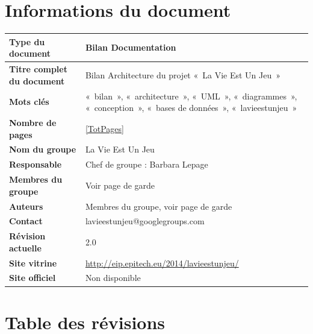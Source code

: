 \documentclass{life-fr}
\begin{document}
\chapter*{Informations du document}

\begin{tabular}{ | m{5cm} | m{10cm} | }
  \hline
  \textbf{Type du document} & Bilan Documentation\\ %
  \hline
  \textbf{Titre complet du document} & Bilan Architecture du projet «~La Vie Est Un Jeu~»\\ %
  \hline
  \textbf{Mots clés} & «~bilan~», «~architecture~», «~UML~», «~diagrammes~», «~conception~», «~bases de données~», «~lavieestunjeu~»\\ %
  \hline
  \textbf{Nombre de pages} & \ref{TotPages} \\
  \hline
  \textbf{Nom du groupe} & La Vie Est Un Jeu\\
  \hline
  \textbf{Responsable} & Chef de groupe : Barbara Lepage\\
  \hline
  \textbf{Membres du groupe} & Voir page de garde\\
  \hline
  \textbf{Auteurs} & Membres du groupe, voir page de garde\\
  \hline
  \textbf{Contact} & lavieestunjeu@googlegroups.com\\
  \hline
  \textbf{Révision actuelle} & 2.0\\ %
  \hline
  \textbf{Site vitrine} & \url{http://eip.epitech.eu/2014/lavieestunjeu/}\\
  \hline
  \textbf{Site officiel} & Non disponible\\
  \hline
\end{tabular}

\chapter*{Table des révisions}
\end{document}
